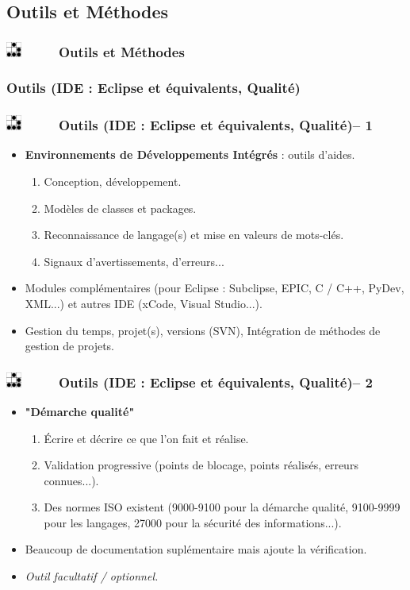 \documentclass[slidetop,11pt]{beamer}
\def\sectionPartId{Outils et M{\'e}thodes}
\def\sectionPartIdUN{Outils (IDE : Eclipse et {\'e}quivalents, Qualit{\'e})}
\def\moreInFrameTitle{\includegraphics[height=0.5cm]{img/logo_glider.png}~~~~~}
\begin{document}
\subsection{\sectionPartId}
\begin{frame}
	\frametitle{\moreInFrameTitle \sectionPartId}
	\tableofcontents[sections=2,subsectionstyle=show/shaded/hide]
\end{frame} 

\subsubsection{\sectionPartIdUN}
\begin{frame}
	\frametitle{\moreInFrameTitle \sectionPartIdUN -- 1}
	\begin{itemize}
		\item \textbf{Environnements de D{\'e}veloppements Int{\'e}gr{\'e}s} : outils d'aides. 
		\begin{enumerate}
			\item Conception, d{\'e}veloppement. 
			\item Mod{\`e}les de classes et packages. 
			\item Reconnaissance de langage(s) et mise en valeurs de mots-cl{\'e}s. 
			\item Signaux d'avertissements, d'erreurs...
		\end{enumerate}
		\item Modules compl{\'e}mentaires (pour Eclipse : Subclipse, EPIC, C / C++, PyDev, XML...) et autres IDE (xCode, Visual Studio...). 
		\item Gestion du temps, projet(s), versions (SVN), Int{\'e}gration de m{\'e}thodes de gestion de projets.
	\end{itemize}
\end{frame}

\begin{frame}
	\frametitle{\moreInFrameTitle \sectionPartIdUN -- 2}
	\begin{itemize}		
		\item \textbf{"D{\'e}marche qualit{\'e}"}
		\begin{enumerate}
			\item {\'E}crire et d{\'e}crire ce que l'on fait et r{\'e}alise. 
			\item Validation progressive (points de blocage, points r{\'e}alis{\'e}s, erreurs connues...). 
			\item Des normes ISO existent (9000-9100 pour la d{\'e}marche qualit{\'e}, 9100-9999 pour les langages, 27000 pour la s{\'e}curit{\'e} des informations...). 
		\end{enumerate}
		\item Beaucoup de documentation supl{\'e}mentaire mais ajoute la v{\'e}rification. 
		\item \emph{Outil facultatif / optionnel. }
	\end{itemize}
\end{frame} 
\end{document}

